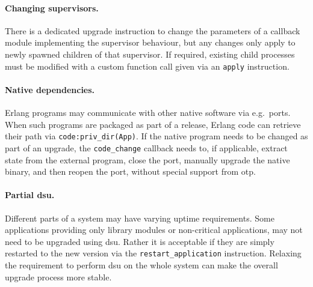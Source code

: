 \paragraph{Changing supervisors.}
There is a dedicated upgrade instruction to change the parameters of a callback module implementing the supervisor behaviour, but any changes only apply to newly spawned children of that supervisor. If required, existing child processes must be modified with a custom function call given via an \lstinline|apply| instruction.

\paragraph{Native dependencies.}
Erlang programs may communicate with other native software via e.g.~ports. When such programs are packaged as part of a release, Erlang code can retrieve their path via \lstinline|code:priv_dir(App)|. If the native program needs to be changed as part of an upgrade, the \lstinline|code_change| callback needs to, if applicable, extract state from the external program, close the port, manually upgrade the native binary, and then reopen the port, without special support from \acrshort{otp}.

\paragraph{Partial \acrshort{dsu}.}
Different parts of a system may have varying uptime requirements. Some applications providing only library modules or non-critical applications, may not need to be upgraded using \acrshort{dsu}. Rather it is acceptable if they are simply restarted to the new version via the \lstinline|restart_application| instruction. Relaxing the requirement to perform \acrshort{dsu} on the whole system can make the overall upgrade process more stable.
